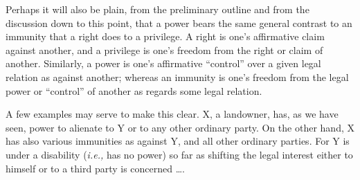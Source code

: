Perhaps it will also be plain, from the preliminary outline and from the
discussion down to this point, that a power bears the same general contrast to
an immunity that a right does to a privilege. A right is one's affirmative
claim against another, and a privilege is one's freedom from the right or claim
of another. Similarly, a power is one's affirmative ``control'' over a given
legal relation as against another; whereas an immunity is one's freedom from
the legal power or ``control'' of another as regards some legal relation.

A few examples may serve to make this clear. X, a landowner, has, as we have
seen, power to alienate to Y or to any other ordinary party. On the other hand,
X has also various immunities as against Y, and all other ordinary parties. For
Y is under a disability (\textit{i.e.,} has no power) so far as shifting the
legal interest either to himself or to a third party is concerned \ldots .

